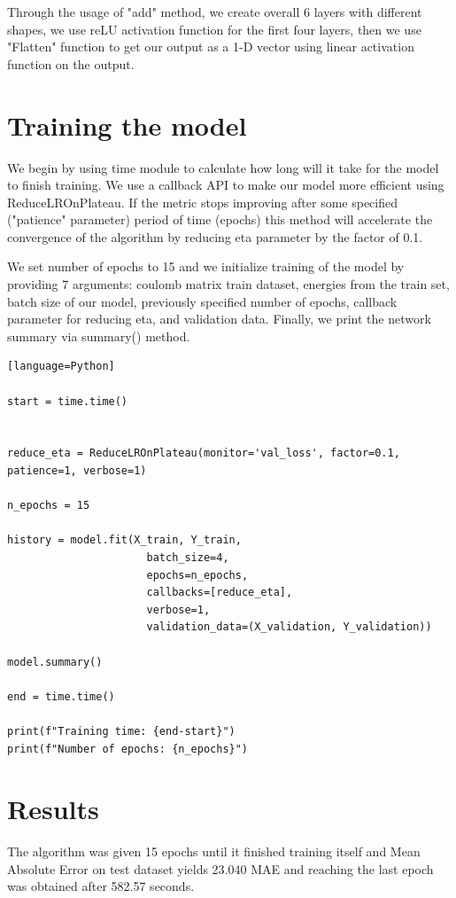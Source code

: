 \documentclass[a4paper,oneside,openright,11pt]{book}
\begin{document}
Through the usage of "add" method, we create overall 6 layers with different shapes, we use reLU activation function for the first four layers, then we use "Flatten" function to get our output as a 1-D vector using linear activation function on the output. 

\section{Training the model}


We begin by using time module to calculate how long will it take for the model to finish training. We use a callback API to make our model more efficient using ReduceLROnPlateau. If the metric stops improving after some specified ("patience" parameter) period of time (epochs) this method will accelerate the convergence of the algorithm by reducing eta parameter by the factor of 0.1.

We set number of epochs to 15 and we initialize training of the model by providing 7 arguments: coulomb matrix train dataset, energies from the train set, batch size of our model, previously specified number of epochs, callback parameter for reducing eta, and validation data. Finally, we print the network summary via summary() method.

\begin{verbatim}[language=Python]

start = time.time()


reduce_eta = ReduceLROnPlateau(monitor='val_loss', factor=0.1, patience=1, verbose=1)

n_epochs = 15

history = model.fit(X_train, Y_train,
                      batch_size=4,
                      epochs=n_epochs, 
                      callbacks=[reduce_eta],
                      verbose=1,
                      validation_data=(X_validation, Y_validation))

model.summary()

end = time.time()

print(f"Training time: {end-start}")
print(f"Number of epochs: {n_epochs}")

\end{verbatim}

\section{Results}


The algorithm was given 15 epochs until it finished training itself and Mean Absolute Error on test dataset yields 23.040 MAE and reaching the last epoch was obtained after 582.57 seconds.
\end{document}
